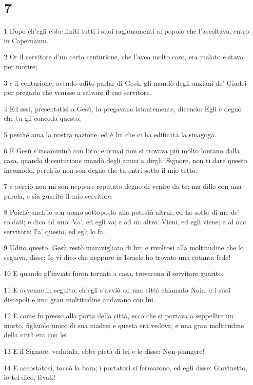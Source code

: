 \chapter{7}

\par 1 Dopo ch'egli ebbe finiti tutti i suoi ragionamenti al popolo che l'ascoltava, entrò in Capernaum.
\par 2 Or il servitore d'un certo centurione, che l'avea molto caro, era malato e stava per morire;
\par 3 e il centurione, avendo udito parlar di Gesù, gli mandò degli anziani de' Giudei per pregarlo che venisse a salvare il suo servitore.
\par 4 Ed essi, presentatisi a Gesù, lo pregavano istantemente, dicendo: Egli è degno che tu gli conceda questo;
\par 5 perché ama la nostra nazione, ed è lui che ci ha edificata la sinagoga.
\par 6 E Gesù s'incamminò con loro; e ormai non si trovava più molto lontano dalla casa, quando il centurione mandò degli amici a dirgli: Signore, non ti dare questo incomodo, perch'io non son degno che tu entri sotto il mio tetto;
\par 7 e perciò non mi son neppure reputato degno di venire da te; ma dillo con una parola, e sia guarito il mio servitore.
\par 8 Poiché anch'io son uomo sottoposto alla potestà altrui, ed ho sotto di me de' soldati; e dico ad uno: Va', ed egli va; e ad un altro: Vieni, ed egli viene; e al mio servitore: Fa' questo, ed egli lo fa.
\par 9 Udito questo, Gesù restò maravigliato di lui; e rivoltosi alla moltitudine che lo seguiva, disse: Io vi dico che neppure in Israele ho trovato una cotanta fede!
\par 10 E quando gl'inviati furon tornati a casa, trovarono il servitore guarito.
\par 11 E avvenne in seguito, ch'egli s'avviò ad una città chiamata Nain, e i suoi discepoli e una gran moltitudine andavano con lui.
\par 12 E come fu presso alla porta della città, ecco che si portava a seppellire un morto, figliuolo unico di sua madre; e questa era vedova; e una gran moltitudine della città era con lei.
\par 13 E il Signore, vedutala, ebbe pietà di lei e le disse: Non piangere!
\par 14 E accostatosi, toccò la bara; i portatori si fermarono, ed egli disse: Giovinetto, io tel dico, lèvati!
